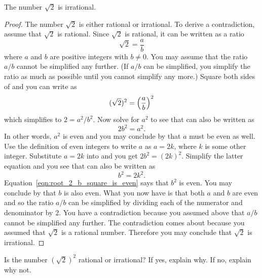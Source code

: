 \documentclass[a4paper,oneside,12pt]{article}
\begin{document}
\begin{theorem}
The number $\sqrt{2}$ is irrational.
\end{theorem}

\begin{proof}
The number $\sqrt{2}$ is either rational or irrational.  To derive a
contradiction, assume that $\sqrt{2}$ is rational.  Since $\sqrt{2}$
is rational, it can be written as a ratio
\begin{equation}
\label{eqn:root_2_as_ratio}
\sqrt{2}
=
\frac{a}{b}
\end{equation}
where $a$ and $b$ are positive integers with $b \neq 0$.  You may
assume that the ratio $a / b$ cannot be simplified any further.  (If
$a/b$ can be simplified, you simplify the ratio as much as possible
until you cannot simplify any more.)  Square both sides of
 and you can write
 as
\[
(\sqrt{2})^2
=
\parenthesis*{
  \frac{a}{b}
}^2
\]
which simplifies to $2 = a^2 / b^2$.  Now solve for $a^2$ to see that
 can also be written as
\begin{equation}
\label{eqn:root_2_a_square_is_even}
2b^2
=
a^2.
\end{equation}
In other words, $a^2$ is even and you may conclude by
 that $a$ must be even as
well.  Use the definition of even integers to write $a$ as $a = 2k$,
where $k$ is some other integer.  Substitute $a = 2k$ into
 and you get $2b^2 = (2k)^2$.
Simplify the latter equation and you see that
 can also be written as
\begin{equation}
\label{eqn:root_2_b_square_is_even}
b^2
=
2k^2.
\end{equation}
Equation~\eqref{eqn:root_2_b_square_is_even} says that $b^2$ is even.
You may conclude by  that
$b$ is also even.  What you now have is that both $a$ and $b$ are
even and so the ratio $a / b$ can be simplified by dividing each of
the numerator and denominator by $2$.  You have a contradiction
because you assumed above that $a / b$ cannot be simplified any
further.  The contradiction comes about because you assumed that
$\sqrt{2}$ is a rational number.  Therefore you may conclude that
$\sqrt{2}$ is irrational.
\end{proof}

\begin{exercise}
\label{ex:square_root_2_squared_is_rational}
Is the number $(\sqrt{2})^2$ rational or irrational?  If yes, explain
why.  If no, explain why not.
\end{exercise}
\end{document}
